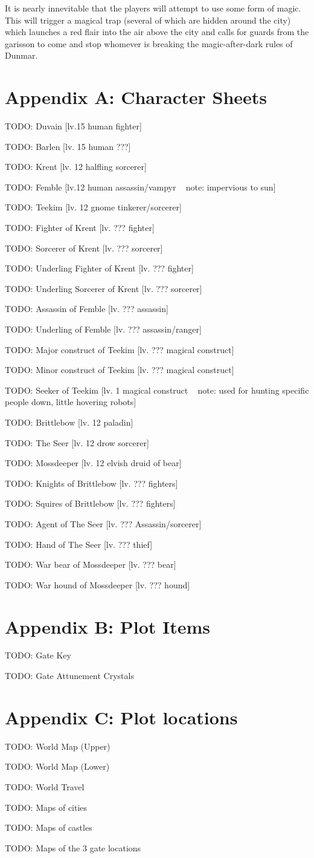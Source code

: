 \documentclass[10pt,twoside,twocolumn]{article}
\begin{document}
It is nearly innevitable that the players will attempt to use some form of magic. This will trigger a magical trap (several of which are hidden around the city) which launches a red flair into the air above the city and calls for guards from the garisson to come and stop whomever is breaking the magic-after-dark rules of Dunmar.

\section{Appendix A: Character Sheets}
TODO: Duvain [lv.15 human fighter]

TODO: Barlen [lv. 15 human ???]

TODO: Krent [lv. 12 halfling sorcerer]

TODO: Femble [lv.12 human assassin/vampyr ~ note: impervious to sun]

TODO: Teekim [lv. 12 gnome tinkerer/sorcerer]

TODO: Fighter of Krent [lv. ??? fighter]

TODO: Sorcerer of Krent [lv. ??? sorcerer]

TODO: Underling Fighter of Krent [lv. ??? fighter]

TODO: Underling Sorcerer of Krent [lv. ??? sorcerer]

TODO: Assassin of Femble [lv. ??? assassin]

TODO: Underling of Femble [lv. ??? assassin/ranger]

TODO: Major construct of Teekim [lv. ??? magical construct]

TODO: Minor construct of Teekim [lv. ??? magical construct]

TODO: Seeker of Teekim [lv. 1 magical construct ~ note: used for hunting specific people down, little hovering robots]

TODO: Brittlebow [lv. 12 paladin]

TODO: The Seer [lv. 12 drow sorcerer]

TODO: Mossdeeper [lv. 12 elvish druid of bear]

TODO: Knights of Brittlebow [lv. ??? fighters]

TODO: Squires of Brittlebow [lv. ??? fighters]

TODO: Agent of The Seer [lv. ??? Assassin/sorcerer]

TODO: Hand of The Seer [lv. ??? thief]

TODO: War bear of Mossdeeper [lv. ??? bear]

TODO: War hound of Mossdeeper [lv. ??? hound]

\section{Appendix B: Plot Items}

TODO: Gate Key

TODO: Gate Attunement Crystals

\section{Appendix C: Plot locations}

TODO: World Map (Upper)

TODO: World Map (Lower)

TODO: World Travel

TODO: Maps of cities

TODO: Maps of castles

TODO: Maps of the 3 gate locations

\end{document}
